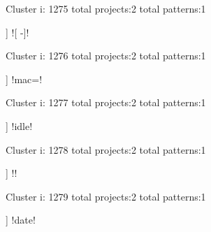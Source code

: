 Cluster i: 1275
total projects:2
total patterns:1
\begin{multicols}{1}
\begin{description}[noitemsep,topsep=0pt]
\item [[2] ] \cverb![ -]!
\end{description}
\end{multicols}







Cluster i: 1276
total projects:2
total patterns:1
\begin{multicols}{1}
\begin{description}[noitemsep,topsep=0pt]
\item [[2] ] \cverb!mac=!
\end{description}
\end{multicols}







Cluster i: 1277
total projects:2
total patterns:1
\begin{multicols}{1}
\begin{description}[noitemsep,topsep=0pt]
\item [[2] ] \cverb!idle!
\end{description}
\end{multicols}







Cluster i: 1278
total projects:2
total patterns:1
\begin{multicols}{1}
\begin{description}[noitemsep,topsep=0pt]
\item [[2] ] \cverb!!
\end{description}
\end{multicols}







Cluster i: 1279
total projects:2
total patterns:1
\begin{multicols}{1}
\begin{description}[noitemsep,topsep=0pt]
\item [[2] ] \cverb!date!
\end{description}
\end{multicols}







